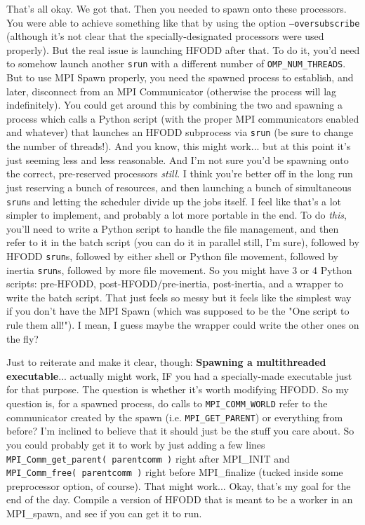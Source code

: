 That's all okay. We got that. Then you needed to spawn onto these processors. You were able to achieve something like that by using the option \texttt{--oversubscribe} (although it's not clear that the specially-designated processors were used properly). But the real issue is launching HFODD after that. To do it, you'd need to somehow launch another \texttt{srun} with a different number of \texttt{OMP\_NUM\_THREADS}. But to use MPI Spawn properly, you need the spawned process to establish, and later, disconnect from an MPI Communicator (otherwise the process will lag indefinitely). You could get around this by combining the two and spawning a process which calls a Python script (with the proper MPI communicators enabled and whatever) that launches an HFODD subprocess via \texttt{srun} (be sure to change the number of threads!). And you know, this might work... but at this point it's just seeming less and less reasonable. And I'm not sure you'd be spawning onto the correct, pre-reserved processors \textit{still}. I think you're better off in the long run just reserving a bunch of resources, and then launching a bunch of simultaneous \texttt{srun}s and letting the scheduler divide up the jobs itself. I feel like that's a lot simpler to implement, and probably a lot more portable in the end. To do \textit{this}, you'll need to write a Python script to handle the file management, and then refer to it in the batch script (you can do it in parallel still, I'm sure), followed by HFODD \texttt{srun}s, followed by either shell or Python file movement, followed by inertia \texttt{srun}s, followed by more file movement. So you might have 3 or 4 Python scripts: pre-HFODD, post-HFODD/pre-inertia, post-inertia, and a wrapper to write the batch script. That just feels so messy but it feels like the simplest way if you don't have the MPI Spawn (which was supposed to be the "One script to rule them all!"). I mean, I guess maybe the wrapper could write the other ones on the fly?

Just to reiterate and make it clear, though: \textbf{Spawning a multithreaded executable}... actually might work, IF you had a specially-made executable just for that purpose. The question is whether it's worth modifying HFODD. So my question is, for a spawned process, do calls to \texttt{MPI\_COMM\_WORLD} refer to the communicator created by the spawn (i.e. \texttt{MPI\_GET\_PARENT}) or everything from before? I'm inclined to believe that it should just be the stuff you care about. So you could probably get it to work by just adding a few lines \texttt{MPI\_Comm\_get\_parent( parentcomm )} right after MPI\_INIT and \texttt{MPI\_Comm\_free( parentcomm )} right before MPI\_finalize (tucked inside some preprocessor option, of course). That might work... Okay, that's my goal for the end of the day. Compile a version of HFODD that is meant to be a worker in an MPI\_spawn, and see if you can get it to run.

